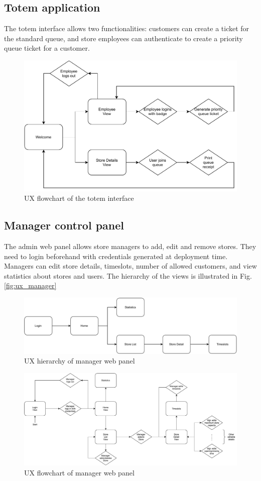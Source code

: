 \subsection{Totem application}

The totem interface allows two functionalities: customers can create a ticket for the standard queue, and store employees can authenticate to create a priority queue ticket for a customer.

\begin{figure}[H]
    \centering
    \includegraphics[width=.5\linewidth]{images/draw.io/ux_totem.pdf}
    \caption{UX flowchart of the totem interface}
    \label{fig:ux_totem}
\end{figure}

\subsection{Manager control panel}

The admin web panel allows store managers to add, edit and remove stores.
They need to login beforehand with credentials generated at deployment time.
Managers can edit store details, timeslots, number of allowed customers, and view statistics about stores and users. The hierarchy of the views is illustrated in Fig. \ref{fig:ux_manager}

\begin{figure}[H]
    \centering
    \includegraphics[width=\linewidth]{images/draw.io/ux_manager.pdf}
    \caption{UX hierarchy of manager web panel}
    \label{fig:ux_manager_hierarchy}
\end{figure}

\begin{figure}[H]
    \centering
    \includegraphics[width=\linewidth]{images/draw.io/ux_manager_flowchart.pdf}
    \caption{UX flowchart of manager web panel}
    \label{fig:ux_manager_flowchart}
\end{figure}